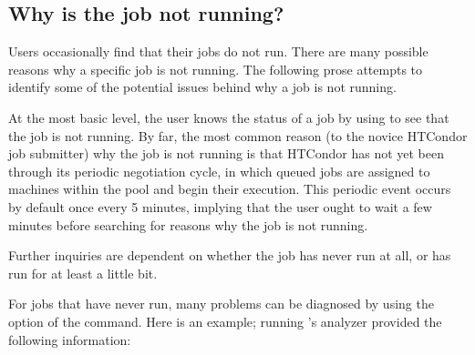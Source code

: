\subsection{\label{sec:job-not-running}Why is the job not running?}
Users occasionally find that their jobs do not run.
There are many possible reasons why a specific job is not running.
The following prose attempts to identify some of the potential issues
behind why a job is not running.

At the most basic level, the user knows the status of a job by
using  to see that the job is not running.
By far, the most common reason (to the novice HTCondor job submitter)
why the job is not running is that HTCondor has not yet 
been through its periodic negotiation cycle,
in which queued jobs are assigned to machines within the pool 
and begin their execution.
This periodic event occurs by default once every 5 minutes,
implying that the user ought to wait a few minutes before
searching for reasons why the job is not running.

Further inquiries are dependent on whether the job has 
never run at all, or has run for at least a little bit.

For jobs that have never run,
many problems can be diagnosed by using the 
option of the  command.
Here is an example; 
running 's analyzer provided the following information:

